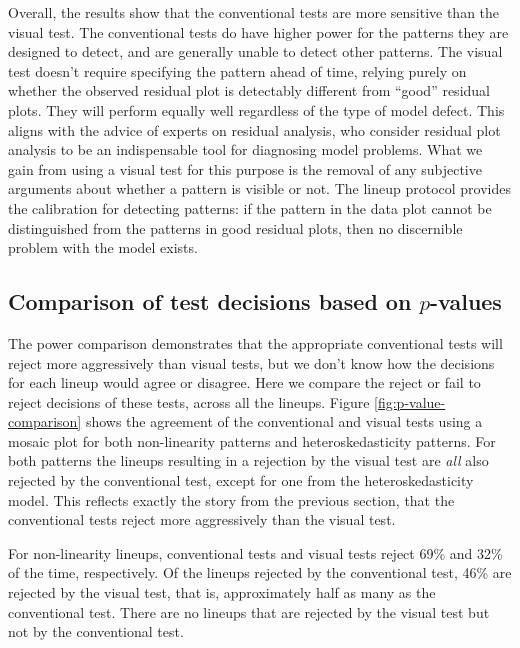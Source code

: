 \documentclass[]{interact}
\theoremstyle{plain}%
\theoremstyle{definition}
\theoremstyle{remark}
\begin{document}
Overall, the results show that the conventional tests are more sensitive
than the visual test. The conventional tests do have higher power for
the patterns they are designed to detect, and are generally unable to
detect other patterns. The visual test doesn't require specifying the
pattern ahead of time, relying purely on whether the observed residual
plot is detectably different from ``good'' residual plots. They will
perform equally well regardless of the type of model defect. This aligns
with the advice of experts on residual analysis, who consider residual
plot analysis to be an indispensable tool for diagnosing model problems.
What we gain from using a visual test for this purpose is the removal of
any subjective arguments about whether a pattern is visible or not. The
lineup protocol provides the calibration for detecting patterns: if the
pattern in the data plot cannot be distinguished from the patterns in
good residual plots, then no discernible problem with the model exists.

\hypertarget{comparison-of-test-decisions-based-on-p-values}{%
\subsection{\texorpdfstring{Comparison of test decisions based on
\(p\)-values\label{p-value}}{Comparison of test decisions based on p-values}}\label{comparison-of-test-decisions-based-on-p-values}}

The power comparison demonstrates that the appropriate conventional
tests will reject more aggressively than visual tests, but we don't know
how the decisions for each lineup would agree or disagree. Here we
compare the reject or fail to reject decisions of these tests, across
all the lineups. Figure \ref{fig:p-value-comparison} shows the agreement
of the conventional and visual tests using a mosaic plot for both
non-linearity patterns and heteroskedasticity patterns. For both
patterns the lineups resulting in a rejection by the visual test are
\emph{all} also rejected by the conventional test, except for one from
the heteroskedasticity model. This reflects exactly the story from the
previous section, that the conventional tests reject more aggressively
than the visual test.

For non-linearity lineups, conventional tests and visual tests reject
69\% and 32\% of the time, respectively. Of the lineups rejected by the
conventional test, 46\% are rejected by the visual test, that is,
approximately half as many as the conventional test. There are no
lineups that are rejected by the visual test but not by the conventional
test.
\end{document}
